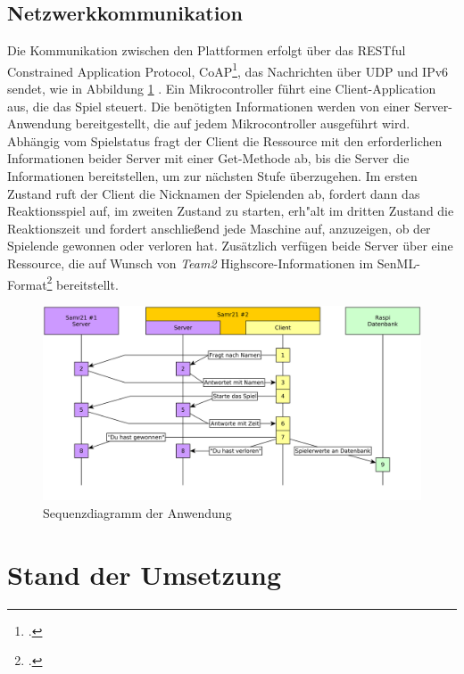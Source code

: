 \documentclass[a4paper]{article}
\begin{document}
  \subsection{Netzwerkkommunikation}
    \label{sec:net}
    Die Kommunikation zwischen den Plattformen erfolgt über das RESTful
    Constrained Application Protocol, CoAP\footcite{COAP}, das Nachrichten über UDP und IPv6
    sendet, wie in Abbildung \ref{fig:seq_diagram} . Ein Mikrocontroller führt
    eine Client-Application aus, die das Spiel steuert. Die benötigten
    Informationen werden von einer Server-Anwendung bereitgestellt, die auf
    jedem Mikrocontroller ausgeführt wird. Abhängig vom Spielstatus fragt der
    Client die Ressource mit den erforderlichen Informationen beider Server mit
    einer Get-Methode ab, bis die Server die Informationen bereitstellen, um
    zur nächsten Stufe überzugehen.  Im ersten Zustand ruft der Client die
    Nicknamen der Spielenden ab, fordert dann das Reaktionsspiel auf, im
    zweiten Zustand zu starten, erh"alt im dritten Zustand die Reaktionszeit
    und fordert anschließend jede Maschine auf, anzuzeigen, ob der Spielende
    gewonnen oder verloren hat.  Zusätzlich verfügen beide Server über eine
    Ressource, die auf Wunsch von \textit{Team2} Highscore-Informationen im
    SenML-Format\footcite{SENML}
    bereitstellt.
    \begin{figure}[h]
      \centering
      \includegraphics[scale=0.1]{team1_kommunikation.png}
      \caption{\label{fig:seq_diagram}Sequenzdiagramm der Anwendung}
    \end{figure}

\section{Stand der Umsetzung}
  \label{sec:status}
\end{document}

